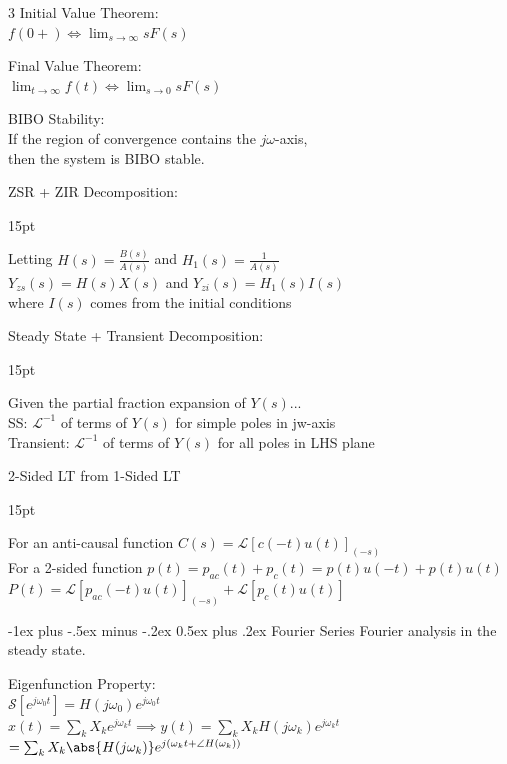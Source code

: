 \documentclass[12pt,landscape,letterpaper]{article}
\makeatletter
\renewcommand{\section}{\@startsection{section}{1}{0mm}%
                                {-1ex plus -.5ex minus -.2ex}%
                                {0.5ex plus .2ex}%
                                {\normalfont\normalsize\bfseries}}
\newcommand{\tab}{\hspace{0.02\textwidth}}
\newcommand{\ds}{\displaystyle}
\newenvironment{tabbed}
{
	\vspace{-\parskip}
	\begin{adjustwidth}{15pt}{}
	}
	{\end{adjustwidth}
}
\makeatother
\begin{document}
\begin{multicols*}{3}
Initial Value Theorem:\\
\tab $\ds f(0+) \Leftrightarrow \lim_{s\rightarrow\infty} sF(s)$

Final Value Theorem:\\
\tab $\ds \lim_{t\rightarrow\infty} f(t) \Leftrightarrow \lim_{s\rightarrow 0} sF(s)$

BIBO Stability:\\
\tab If the region of convergence contains the $j\omega$-axis,\\
\tab then the system is BIBO stable.

ZSR + ZIR Decomposition:\\
\begin{tabbed}
	Letting $H(s) = \frac{B(s)}{A(s)}$ and $H_1(s) = \frac{1}{A(s)}$\\
	$Y_{zs}(s) = H(s)X(s)$ \quad and \quad $Y_{zi}(s) = H_1(s)I(s)$\\
	where $I(s)$ comes from the initial conditions
\end{tabbed}

Steady State + Transient Decomposition:\\
\begin{tabbed}
	Given the partial fraction expansion of $Y(s)$...\\
	SS: $\mathcal{L}^{-1}$ of terms of $Y(s)$ for simple poles in jw-axis\\
	Transient: $\mathcal{L}^{-1}$ of terms of $Y(s)$ for all poles in LHS plane
\end{tabbed}

2-Sided LT from 1-Sided LT
\begin{tabbed}
	For an anti-causal function $C(s)=\mathcal{L}\left[c(-t)u(t)\right]_{(-s)}$\\
	For a 2-sided function $p(t) = p_{ac}(t) + p_c(t) = p(t)u(-t) + p(t)u(t)$\\
	$P(t)=\mathcal{L}\left[p_{ac}(-t)u(t)\right]_{(-s)} + \mathcal{L}\left[p_{c}(t)u(t)\right]$
\end{tabbed}

\section{Fourier Series}
\tab Fourier analysis in the steady state.

Eigenfunction Property:\\
\tab $\mathcal{S}[e^{j\omega_0t}] = H(j\omega_0)e^{j\omega_0t}$\\
\tab $x(t) = \sum_k X_k e^{j\omega_kt} \implies y(t) = \sum_k X_k H(j\omega_k)e^{j\omega_kt}$\\\vspace{1mm}\hspace{2.5cm}$= \sum_k X_k \abs{H(j\omega_k)}e^{j(\omega_kt + \angle H(\omega_k))}$


\end{multicols*}
\end{document}
